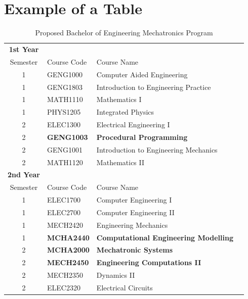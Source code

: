 \documentclass{UoNMCHA}
\numberwithin{equation}{section}
\begin{document}
\section{Example of a Table}\label{app:Table}
\begin{table}[h!]
    \begin{center}\label{tab:MCHAProg}
        \caption{Proposed Bachelor of Engineering Mechatronics Program}\label{tab:notation}
        {\footnotesize
            \begin{tabular}{c l l l|}
                \hline\hline \textbf{1st Year} & & \\
                Semester & {Course Code} & {Course Name} \\ \hline 
                1 & GENG1000 & Computer Aided Engineering \\
                1 & GENG1803 & Introduction to Engineering Practice\\
                1 & MATH1110 & Mathematics I\\
                1 & PHYS1205 & Integrated Physics\\ \hline
                2 & ELEC1300 & Electrical Engineering I\\
                2 & \textbf{GENG1003} & \textbf{Procedural Programming}  \\
                2 & GENG1001 & Introduction to Engineering Mechanics\\
                2 & MATH1120 & Mathematics II 
                \\ \hline
                \hline \textbf{2nd Year} &  \\
                Semester & {Course Code} & {Course Name} \\ \hline 
                1 & ELEC1700 & Computer Engineering I\\
                1 & ELEC2700 & Computer Engineering II\\
                1 & MECH2420 & Engineering Mechanics\\
                1 & \textbf{MCHA2440} & \textbf{Computational Engineering Modelling} \\ \hline
                2 & \textbf{MCHA2000} & \textbf{Mechatronic Systems} \\
                2 & \textbf{MECH2450} & \textbf{Engineering Computations II} \\
                2 & MECH2350 & Dynamics II\\
                2 & ELEC2320 & Electrical Circuits\\ \hline

\end{tabular}}
\end{center}
\end{table}
\end{document}
